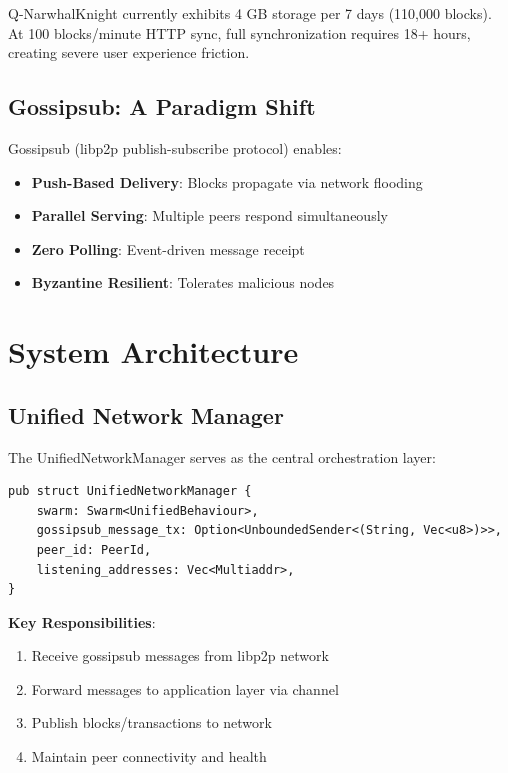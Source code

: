 \documentclass[11pt,a4paper]{article}
\begin{document}
Q-NarwhalKnight currently exhibits 4 GB storage per 7 days (110,000 blocks). At 100 blocks/minute HTTP sync, full synchronization requires 18+ hours, creating severe user experience friction.

\subsection{Gossipsub: A Paradigm Shift}

Gossipsub (libp2p publish-subscribe protocol) enables:

\begin{itemize}
\item \textbf{Push-Based Delivery}: Blocks propagate via network flooding
\item \textbf{Parallel Serving}: Multiple peers respond simultaneously
\item \textbf{Zero Polling}: Event-driven message receipt
\item \textbf{Byzantine Resilient}: Tolerates malicious nodes
\end{itemize}

\section{System Architecture}

\subsection{Unified Network Manager}

The UnifiedNetworkManager serves as the central orchestration layer:

\begin{verbatim}
pub struct UnifiedNetworkManager {
    swarm: Swarm<UnifiedBehaviour>,
    gossipsub_message_tx: Option<UnboundedSender<(String, Vec<u8>)>>,
    peer_id: PeerId,
    listening_addresses: Vec<Multiaddr>,
}
\end{verbatim}

\textbf{Key Responsibilities}:
\begin{enumerate}
\item Receive gossipsub messages from libp2p network
\item Forward messages to application layer via channel
\item Publish blocks/transactions to network
\item Maintain peer connectivity and health
\end{enumerate}
\end{document}
